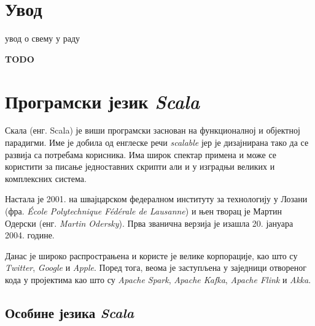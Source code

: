 \documentclass[12pt,oneside]{memoir}
\begin{document}
\frontmatter
\naslovna
\komisija
\apstrakt
\tableofcontents*

\mainmatter


\chapter{Увод}
\label{chp:uvod}

увод о свему у раду

\textbf{TODO}

\chapter{Програмски језик \textit{Scala}}
\label{chp:scala}

Скала (енг. Scala) је виши програмски заснован на функционалној и објектној парадигми. Име је добила од енглеске речи \textit{scalable} јер је дизајнирана тако да се развија са потребама корисника. Има широк спектар примена и може се користити за писање једноставних скрипти али и у изградњи великих и комплексних система. \cite{scala_prog}

Настала је 2001. на швајцарском федералном институту за технологију у Лозани (фра. \textit{École Polytechnique Fédérale de Lausanne}) и њен творац је Мартин Одерски (енг. \textit{Martin Odersky}). Прва званична верзија је изашла 20. јануара 2004. године.

Данас је широко распрострањена и користе је велике корпорације, као што су \textit{Twitter}, \textit{Google} и \textit{Apple}. Поред тога, веома је заступљена у заједници отвореног кода у пројектима као што су \textit{Apache Spark}, \textit{Apache Kafka}, \textit{Apache Flink} и \textit{Akka}.

\section{Особине језика \textit{Scala}}
\label{sec:osоб_scala}
\end{document}
